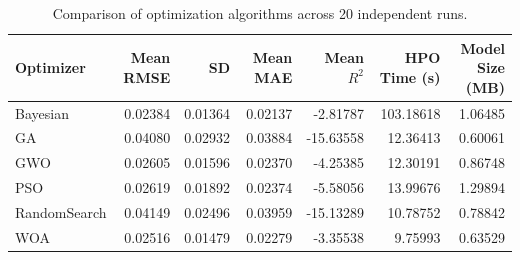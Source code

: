 \begin{table}[htbp]
\centering
\caption{Comparison of optimization algorithms across 20 independent runs.}
\label{tab:optimizer_comparison}
\begin{tabular}{lrrrrrr}
\hline
Optimizer & Mean RMSE & SD & Mean MAE & Mean $R^2$ & HPO Time (s) & Model Size (MB) \\
\hline
Bayesian & 0.02384 & 0.01364 & 0.02137 & -2.81787 & 103.18618 & 1.06485 \\
GA & 0.04080 & 0.02932 & 0.03884 & -15.63558 & 12.36413 & 0.60061 \\
GWO & 0.02605 & 0.01596 & 0.02370 & -4.25385 & 12.30191 & 0.86748 \\
PSO & 0.02619 & 0.01892 & 0.02374 & -5.58056 & 13.99676 & 1.29894 \\
RandomSearch & 0.04149 & 0.02496 & 0.03959 & -15.13289 & 10.78752 & 0.78842 \\
WOA & 0.02516 & 0.01479 & 0.02279 & -3.35538 & 9.75993 & 0.63529 \\
\hline
\end{tabular}
\end{table}
